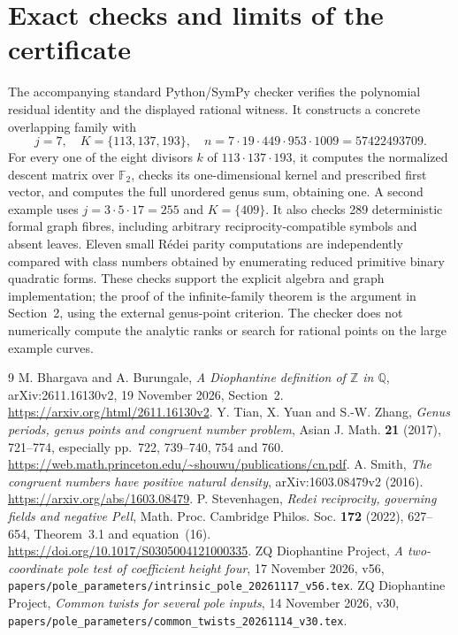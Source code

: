 \documentclass[11pt,a4paper]{article}
\theoremstyle{remark}\newtheorem{remark}[theorem]{Remark}
\newcommand{\Q}{\mathbb Q}\newcommand{\Z}{\mathbb Z}\newcommand{\F}{\mathbb F}
\begin{document}
\section{Exact checks and limits of the certificate}
The accompanying standard Python/SymPy checker verifies the
polynomial residual identity and the displayed rational witness.
It constructs a concrete overlapping family with
\[
 j=7,\quad K=\{113,137,193\},\quad
 n=7\cdot19\cdot449\cdot953\cdot1009=57422493709.
\]
For every one of the eight divisors $k$ of $113\cdot137\cdot193$,
it computes the normalized descent matrix over $\F_2$, checks its
one-dimensional kernel and prescribed first vector, and computes
the full unordered genus sum, obtaining one. A second example uses
$j=3\cdot5\cdot17=255$ and $K=\{409\}$.
It also checks 289 deterministic formal graph fibres, including
arbitrary reciprocity-compatible symbols and absent leaves.
Eleven small R\'edei parity computations are independently compared
with class numbers obtained by enumerating reduced primitive binary
quadratic forms. These checks support the explicit algebra and graph
implementation; the proof of the infinite-family theorem is the
argument in Section~2, using the external genus-point criterion.
The checker does not numerically compute the analytic ranks or
search for rational points on the large example curves.

\begin{thebibliography}{9}
 M. Bhargava and A. Burungale,
\emph{A Diophantine definition of $\Z$ in $\Q$},
arXiv:2611.16130v2, 19 November 2026, Section~2.
\url{https://arxiv.org/html/2611.16130v2}.
 Y. Tian, X. Yuan and S.-W. Zhang,
\emph{Genus periods, genus points and congruent number problem},
Asian J. Math. \textbf{21} (2017), 721--774, especially
pp.~722, 739--740, 754 and 760.
\url{https://web.math.princeton.edu/~shouwu/publications/cn.pdf}.
 A. Smith,
\emph{The congruent numbers have positive natural density},
arXiv:1603.08479v2 (2016).
\url{https://arxiv.org/abs/1603.08479}.
 P. Stevenhagen,
\emph{Redei reciprocity, governing fields and negative Pell},
Math. Proc. Cambridge Philos. Soc. \textbf{172} (2022), 627--654,
Theorem~3.1 and equation~(16).
\url{https://doi.org/10.1017/S0305004121000335}.
 ZQ Diophantine Project,
\emph{A two-coordinate pole test of coefficient height four},
17 November 2026, v56,
\nolinkurl{papers/pole_parameters/intrinsic_pole_20261117_v56.tex}.
 ZQ Diophantine Project,
\emph{Common twists for several pole inputs}, 14 November 2026, v30,
\nolinkurl{papers/pole_parameters/common_twists_20261114_v30.tex}.
\end{thebibliography}
\end{document}
